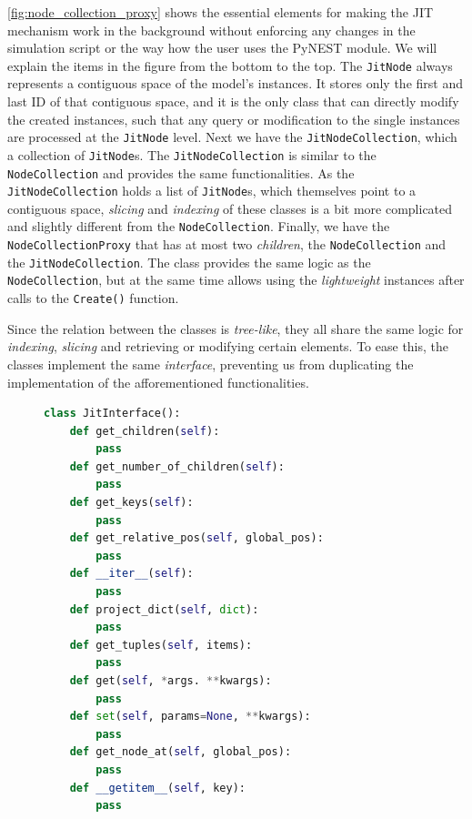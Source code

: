 \autoref{fig:node_collection_proxy} shows the essential elements for making the JIT mechanism work in the background without enforcing any changes in the simulation script or the way how the user uses the PyNEST module. We will explain the items in the figure from the bottom to the top. The \texttt{JitNode} always represents a contiguous space of the model's instances. It stores only the first and last ID of that contiguous space, and it is the only class that can directly modify the created instances, such that any query or modification to the single instances are processed at the \texttt{JitNode} level. Next we have the \texttt{JitNodeCollection}, which a collection of \texttt{JitNode}s. The \texttt{JitNodeCollection} is similar to the \texttt{NodeCollection} and provides the same functionalities. As the \texttt{JitNodeCollection} holds a list of \texttt{JitNode}s, which themselves point to a contiguous space, \emph{slicing} and \emph{indexing} of these classes is a bit more complicated and slightly different from the \texttt{NodeCollection}. Finally, we have the \texttt{NodeCollectionProxy} that has at most two \emph{children}, the \texttt{NodeCollection} and the \texttt{JitNodeCollection}. The class provides the same logic as the \texttt{NodeCollection}, but at the same time allows using the \emph{lightweight} instances after calls to the \texttt{Create()} function.

Since the relation between the classes is \emph{tree-like}, they all share the same logic for \emph{indexing}, \emph{slicing} and retrieving or modifying certain elements. To ease this, the classes implement the same \emph{interface}, preventing us from duplicating the implementation of the afforementioned functionalities.

\begin{figure}[ht!]
\centering
\begin{lstlisting}[language=Python, label=lst:jit_interface, caption={The JitInterface}]
class JitInterface():
    def get_children(self):
        pass
    def get_number_of_children(self):
        pass
    def get_keys(self):
        pass
    def get_relative_pos(self, global_pos):
        pass
    def __iter__(self):
        pass
    def project_dict(self, dict):
        pass
    def get_tuples(self, items):
        pass
    def get(self, *args. **kwargs):
        pass
    def set(self, params=None, **kwargs):
        pass
    def get_node_at(self, global_pos):
        pass
    def __getitem__(self, key):
        pass
\end{lstlisting}
\end{figure}

